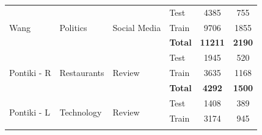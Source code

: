\documentclass[12pt, a4paper]{report}
\theoremstyle{definition}
\theoremstyle{definition}%
\theoremstyle{definition}%
\theoremstyle{definition}%
\theoremstyle{definition}%
\theoremstyle{definition}%
\begin{document}
\begin{table}[]
\begin{tabular}{|l|l|l|l|c|c|}
\multirow{3}{*}{Wang}                  & \multirow{3}{*}{Politics}            & \multirow{3}{*}{Social Media}      & Test                                & 4385                                                                & 755                                                                \\
                                       &                                      &                                    & Train                               & 9706                                                                & 1855                                                               \\ \cline{4-6} 
                                       &                                      &                                    & \textbf{Total}                      & \textbf{11211}                                                      & \textbf{2190}                                                      \\ \hline\hline
\multirow{3}{*}{Pontiki - R}           & \multirow{3}{*}{Restaurants}         & \multirow{3}{*}{Review}            & Test                                & 1945                                                                & 520                                                                \\
                                       &                                      &                                    & Train                               & 3635                                                                & 1168                                                               \\ \cline{4-6} 
                                       &                                      &                                    & \textbf{Total}                      & \textbf{4292}                                                       & \textbf{1500}                                                      \\ \hline\hline
\multirow{3}{*}{Pontiki - L}           & \multirow{3}{*}{Technology}          & \multirow{3}{*}{Review}            & Test                                & 1408                                                                & 389                                                                \\
                                       &                                      &                                    & Train                               & 3174                                                                & 945                                                                \\ \cline{4-6} 

\end{tabular}
\end{table}
\end{document}

